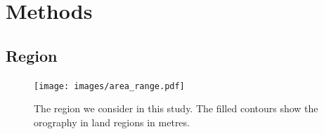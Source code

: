 \documentclass{article}
\begin{document}



\section{Methods}
\subsection{Region}


\begin{figure}[t]
    \centering
    \texttt{[image: images/area\_range.pdf]}
    
    \caption{The region we consider in this study. The filled contours show the orography in land regions in metres.}
    \label{fig:region}
\end{figure}
\end{document}
